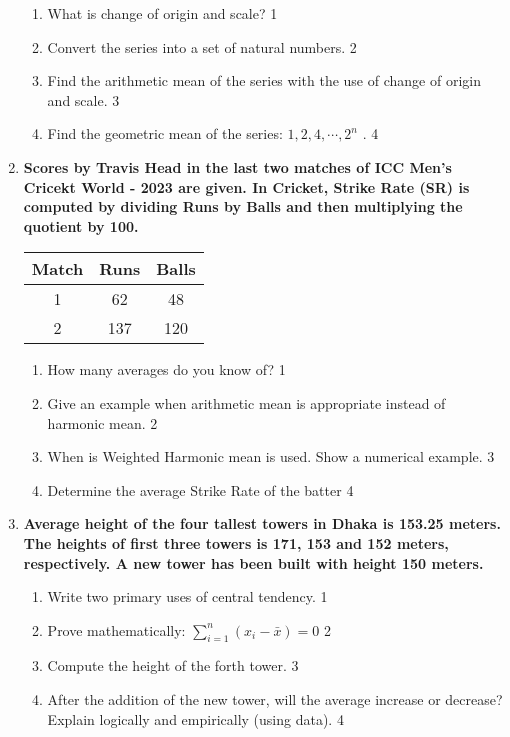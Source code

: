 \documentclass[a4paper,oneside]{book}
\begin{document}
\begin{enumerate}
  \begin{enumerate}
    \item
	What is change of origin and scale? \hfill 1
    \item
	Convert the series into a set of natural numbers. \hfill 2
    \item  
	Find the arithmetic mean of the series with the use of change of origin and scale. \hfill 3
    \item
	Find the geometric mean of the series: $1, 2, 4, \cdots , 2^n$ . \hfill 4
  \end{enumerate}

 \item
	  \textbf{Scores by Travis Head in the last two matches of ICC Men's 
	  Cricekt World - 2023 are given. In Cricket, Strike Rate (SR) is computed by dividing Runs by Balls and then multiplying the quotient by 100.} 
	  
	  \begin{table}[h]
	  \centering
\begin{tabular}{c|c|c}
Match & Runs & Balls \\ \hline 
1 & 62 & 48 \\
2 & 137 & 120 \\ \hline 
\end{tabular}
\end{table}
  
  \begin{enumerate}
    \item
	How many averages do you know of? \hfill 1
    \item
	Give an example when arithmetic mean is appropriate instead of harmonic mean. \hfill 2
    \item  
	When is Weighted Harmonic mean is used. Show a numerical example. \hfill 3
    \item
	Determine the average Strike Rate of the batter \hfill 4
  \end{enumerate}
  
   \item
	  \textbf{Average height of the four tallest towers in Dhaka is 153.25 meters. The heights of first three towers is 171, 153 and 152 meters, respectively. A new tower has been built with height 150 meters.} 
  
  \begin{enumerate}
    \item
	Write two primary uses of central tendency. \hfill 1
    \item
	Prove mathematically: $\displaystyle \sum_{i=1}^n (x_i-\bar x) = 0$ \hfill 2
    \item  
	Compute the height of the forth tower. \hfill 3
    \item
	After the addition of the new tower, will the average increase or decrease? Explain logically and empirically (using data). \hfill 4
  \end{enumerate}


\end{enumerate}
\end{document}

